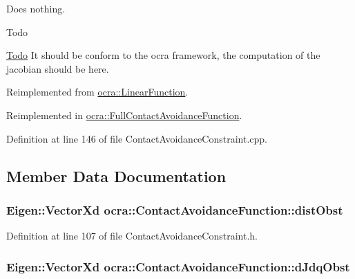 Does nothing.

\begin{DoxyRefDesc}{Todo}
\item[\hyperlink{todo__todo000001}{Todo}]It should be conform to the ocra framework, the computation of the jacobian should be here. \end{DoxyRefDesc}


Reimplemented from \hyperlink{classocra_1_1LinearFunction_a544c87a4f02b4d80ae70e53b80c74461}{ocra\+::\+Linear\+Function}.



Reimplemented in \hyperlink{classocra_1_1FullContactAvoidanceFunction_a3c2af64d4975ee6f0c148dc41eb334d8}{ocra\+::\+Full\+Contact\+Avoidance\+Function}.



Definition at line 146 of file Contact\+Avoidance\+Constraint.\+cpp.



\subsection{Member Data Documentation}
\subsubsection[{\texorpdfstring{dist\+Obst}{distObst}}]{\setlength{\rightskip}{0pt plus 5cm}Eigen\+::\+Vector\+Xd ocra\+::\+Contact\+Avoidance\+Function\+::dist\+Obst\hspace{0.3cm}{\ttfamily [protected]}}\hypertarget{classocra_1_1ContactAvoidanceFunction_aa3d1b5f23d42c0936b1fa09ad7988732}{}\label{classocra_1_1ContactAvoidanceFunction_aa3d1b5f23d42c0936b1fa09ad7988732}


Definition at line 107 of file Contact\+Avoidance\+Constraint.\+h.

\subsubsection[{\texorpdfstring{d\+Jdq\+Obst}{dJdqObst}}]{\setlength{\rightskip}{0pt plus 5cm}Eigen\+::\+Vector\+Xd ocra\+::\+Contact\+Avoidance\+Function\+::d\+Jdq\+Obst\hspace{0.3cm}{\ttfamily [protected]}}\hypertarget{classocra_1_1ContactAvoidanceFunction_a59c655299c8db310d3e06a47729f0780}{}\label{classocra_1_1ContactAvoidanceFunction_a59c655299c8db310d3e06a47729f0780}


